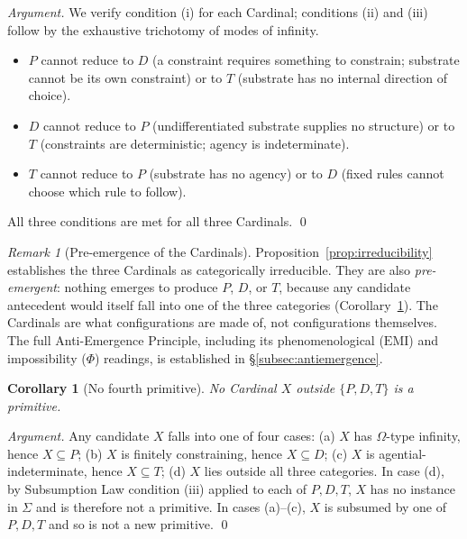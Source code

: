 \documentclass[11pt,a4paper]{article}
\newtheorem{corollary}[theorem]{Corollary}
\theoremstyle{definition}
\theoremstyle{remark}
\newtheorem{remark}[theorem]{Remark}
\begin{document}
\begin{proof}[Argument]
We verify condition (i) for each Cardinal; conditions (ii) and (iii) follow by the exhaustive trichotomy of modes of infinity.
\begin{itemize}[leftmargin=*]
\item $P$ cannot reduce to $D$ (a constraint requires something to constrain; substrate cannot be its own constraint) or to $T$ (substrate has no internal direction of choice).
\item $D$ cannot reduce to $P$ (undifferentiated substrate supplies no structure) or to $T$ (constraints are deterministic; agency is indeterminate).
\item $T$ cannot reduce to $P$ (substrate has no agency) or to $D$ (fixed rules cannot choose which rule to follow).
\end{itemize}
All three conditions are met for all three Cardinals. \qed
\end{proof}

\begin{remark}[Pre-emergence of the Cardinals]\label{rem:pre-emergence}
Proposition~\ref{prop:irreducibility} establishes the three Cardinals as categorically irreducible. They are also \emph{pre-emergent}: nothing emerges to produce $P$, $D$, or $T$, because any candidate antecedent would itself fall into one of the three categories (Corollary~\ref{cor:nofourth}). The Cardinals are what configurations are made of, not configurations themselves. The full Anti-Emergence Principle, including its phenomenological ($\mathrm{EMI}$) and impossibility ($\Phi$) readings, is established in \S\ref{subsec:antiemergence}.
\end{remark}

\begin{corollary}[No fourth primitive]\label{cor:nofourth}
No Cardinal $X$ outside $\{P,D,T\}$ is a primitive.
\end{corollary}

\begin{proof}[Argument]
Any candidate $X$ falls into one of four cases: (a) $X$ has $\Omega$-type infinity, hence $X \subseteq P$; (b) $X$ is finitely constraining, hence $X \subseteq D$; (c) $X$ is agential-indeterminate, hence $X \subseteq T$; (d) $X$ lies outside all three categories. In case (d), by Subsumption Law condition (iii) applied to each of $P,D,T$, $X$ has no instance in $\Sigma$ and is therefore not a primitive. In cases (a)--(c), $X$ is subsumed by one of $P,D,T$ and so is not a new primitive. \qed
\end{proof}
\end{document}
